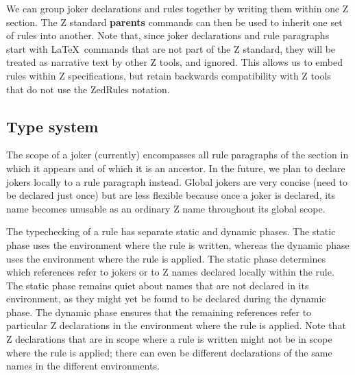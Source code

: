 \documentclass{entcs}
\begin{document}
We can group joker declarations and rules together by writing them
within one Z section.  The Z standard \textbf{parents} commands can
then be used to inherit one set of rules into another.  Note that,
since joker declarations and rule paragraphs start with \LaTeX\
commands that are not part of the Z standard, they will be treated as
narrative text by other Z tools, and ignored.  This allows us to embed
rules within Z specifications, but retain backwards compatibility with
Z tools that do not use the ZedRules notation.

\subsection{Type system}

The scope of a joker (currently) encompasses all rule paragraphs of the
section in which it appears and of which it is an ancestor.  In the
future, we plan to declare jokers locally to a rule paragraph instead.
Global jokers are very concise (need to be declared just once) but are
less flexible because once a joker is declared,
its name becomes unusable as an ordinary Z name throughout its global scope.

%
The typechecking of a rule has separate static and dynamic phases.
The static phase uses the environment where the rule is written,
whereas the dynamic phase uses the environment where the rule is applied.
The static phase determines which references refer to jokers
or to Z names declared locally within the rule.
The static phase remains quiet about
names that are not declared in its environment,
as they might yet be found to be declared during the dynamic phase.
The dynamic phase ensures that the remaining references
refer to particular Z declarations in the environment where the rule is applied.
%
Note that Z declarations that are in scope where a rule is written
might not be in scope where the rule is applied;
there can even be different declarations of the same names
in the different environments.
\end{document}
